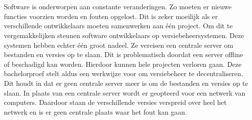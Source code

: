 


%



\chapter*{}
%
%
Software is onderworpen aan constante veranderingen. Zo moeten er nieuwe functies voorzien worden en fouten opgelost. Dit is zeker moeilijk als er verschillende ontwikkelaars moeten samenwerken aan één project. Om dit te vergemakkelijken steunen software ontwikkelaars op versiebeheersystemen. Deze systemen hebben echter één groot nadeel. Ze vereisen een centrale server om bestanden en versies op te slaan.  Dit is problematisch doordat een server offline of beschadigd kan worden. Hierdoor kunnen hele projecten verloren gaan. Deze bachelorproef stelt aldus een werkwijze voor om versiebeheer te decentraliseren. Dit houdt in dat er geen centrale server meer is om de bestanden en versies op te slaan. In plaats van een centrale server wordt er geopteerd voor een netwerk van computers. Daardoor staan de verschillende versies verspreid over heel het netwerk en is er geen centrale plaats waar het fout kan gaan.\\

